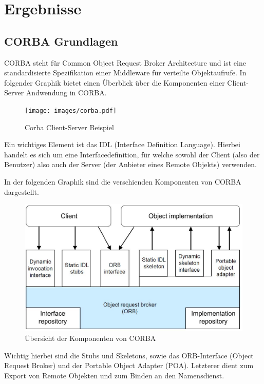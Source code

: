 
\section{Ergebnisse}
\label{sec:Ergebnisse}

\subsection{CORBA Grundlagen}
CORBA steht f\"ur Common Object Request Broker Architecture und ist eine standardisierte Spezifikation einer Middleware f\"ur verteilte Objektaufrufe.
In folgender Graphik bietet einen \"Uberblick \"uber die Komponenten einer Client-Server Andwendung in CORBA.

\begin{figure}[H]
	\begin{center}
		\texttt{[image: images/corba.pdf]}
		\caption{Corba Client-Server Beispiel\cite{corba-client-server}}
		\label{broker}
	\end{center}
\end{figure}

Ein wichtiges Element ist das IDL (Interface Definition Language).
Hierbei handelt es sich um eine Interfacedefinition, f\"ur welche sowohl der Client (also der Benutzer) also auch der Server (der Anbieter eines Remote Objekts) verwenden.

In der folgenden Graphik sind die verschienden Komponenten von CORBA dargestellt.
\begin{figure}[H]
	\begin{center}
		\includegraphics[width=0.5\linewidth]{images/corba.jpg}
		\caption{\"Ubersicht der Komponenten von CORBA \cite{corba-components}}
		\label{broker}
	\end{center}
\end{figure}

Wichtig hierbei sind die Stubs und Skeletons, sowie das ORB-Interface (Object Request Broker) und der Portable Object Adapter (POA).
Letzterer dient zum Export von Remote Objekten und zum Binden an den Namensdienst.

